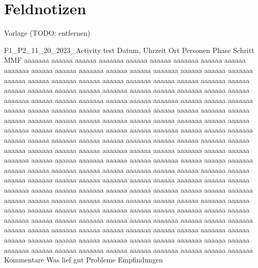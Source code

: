 \chapter{Feldnotizen}
\label{chap:field-notes}

Vorlage (TODO: entfernen)

\fieldnotelong
{F1\_P2\_11\_20\_2023\_Activity}
{test}
{Datum, Uhrzeit}
{Ort}
{Personen}
{Phase Schritt MMF}
{
	aaaaaaa aaaaaa aaaaaa aaaaaaa aaaaaa aaaaaa aaaaaaa aaaaaa aaaaaa aaaaaaa aaaaaa aaaaaa aaaaaaa aaaaaa aaaaaa aaaaaaa aaaaaa aaaaaa aaaaaaa aaaaaa aaaaaa aaaaaaa aaaaaa aaaaaa aaaaaaa aaaaaa aaaaaa aaaaaaa aaaaaa aaaaaa aaaaaaa aaaaaa aaaaaa aaaaaaa aaaaaa aaaaaa aaaaaaa aaaaaa aaaaaa aaaaaaa aaaaaa aaaaaa aaaaaaa aaaaaa aaaaaa aaaaaaa aaaaaa aaaaaa aaaaaaa aaaaaa aaaaaa aaaaaaa aaaaaa aaaaaa aaaaaaa aaaaaa aaaaaa aaaaaaa aaaaaa aaaaaa aaaaaaa aaaaaa aaaaaa aaaaaaa aaaaaa aaaaaa aaaaaaa aaaaaa aaaaaa aaaaaaa aaaaaa aaaaaa aaaaaaa aaaaaa aaaaaa aaaaaaa aaaaaa aaaaaa aaaaaaa aaaaaa aaaaaa aaaaaaa aaaaaa aaaaaa aaaaaaa aaaaaa aaaaaa aaaaaaa aaaaaa aaaaaa aaaaaaa aaaaaa aaaaaa aaaaaaa aaaaaa aaaaaa aaaaaaa aaaaaa aaaaaa aaaaaaa aaaaaa aaaaaa aaaaaaa aaaaaa aaaaaa aaaaaaa aaaaaa aaaaaa aaaaaaa aaaaaa aaaaaa aaaaaaa aaaaaa aaaaaa aaaaaaa aaaaaa aaaaaa aaaaaaa aaaaaa aaaaaa aaaaaaa aaaaaa aaaaaa aaaaaaa aaaaaa aaaaaa aaaaaaa aaaaaa aaaaaa aaaaaaa aaaaaa aaaaaa aaaaaaa aaaaaa aaaaaa aaaaaaa aaaaaa aaaaaa aaaaaaa aaaaaa aaaaaa aaaaaaa aaaaaa aaaaaa aaaaaaa aaaaaa aaaaaa aaaaaaa aaaaaa aaaaaa aaaaaaa aaaaaa aaaaaa aaaaaaa aaaaaa aaaaaa aaaaaaa aaaaaa aaaaaa aaaaaaa aaaaaa aaaaaa aaaaaaa aaaaaa aaaaaa aaaaaaa aaaaaa aaaaaa aaaaaaa aaaaaa aaaaaa aaaaaaa aaaaaa aaaaaa aaaaaaa aaaaaa aaaaaa aaaaaaa aaaaaa aaaaaa aaaaaaa aaaaaa aaaaaa aaaaaaa aaaaaa aaaaaa aaaaaaa aaaaaa aaaaaa aaaaaaa aaaaaa aaaaaa aaaaaaa aaaaaa aaaaaa aaaaaaa aaaaaa aaaaaa aaaaaaa
}
{Kommentare}
{Was lief gut}
{Probleme}
{Empfindungen}

